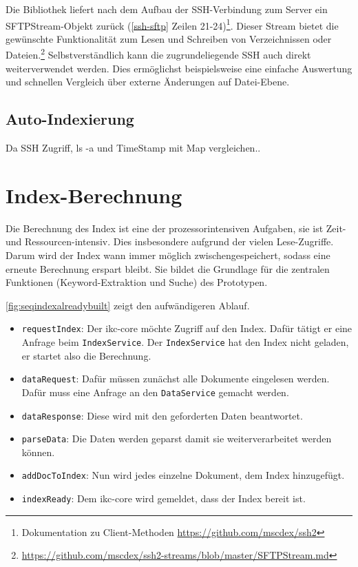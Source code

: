 Die Bibliothek liefert nach dem Aufbau der \gls{SSH}-Verbindung zum Server ein \gls{SFTP}\gls{Stream}-Objekt zurück (\autoref{ssh-sftp} Zeilen 21-24)\footnote{Dokumentation zu Client-Methoden \url{https://github.com/mscdex/ssh2}}. Dieser \gls{Stream} bietet die gewünschte Funktionalität zum Lesen und Schreiben von Verzeichnissen oder Dateien.\footnote{\url{https://github.com/mscdex/ssh2-streams/blob/master/SFTPStream.md}} Selbstverständlich kann die zugrundeliegende \gls{SSH} auch direkt weiterverwendet werden. Dies ermöglichst beispielsweise eine einfache Auswertung und schnellen Vergleich über externe Änderungen auf Datei-Ebene.


\subsection{Auto-Indexierung}

Da SSH Zugriff, ls -a und TimeStamp mit Map vergleichen..

    
\section{Index-Berechnung}

Die Berechnung des Index ist eine der prozessorintensiven Aufgaben, sie ist Zeit- und Ressourcen-intensiv. Dies insbesondere aufgrund der vielen Lese-Zugriffe. Darum wird der Index wann immer möglich zwischengespeichert, sodass eine erneute Berechnung erspart bleibt. Sie bildet die Grundlage für die zentralen Funktionen (\gls{Keyword}-Ex\-trak\-tion und Suche) des Prototypen.  

\autoref{fig:seqindexalreadybuilt} zeigt den aufwändigeren Ablauf. 
\begin{itemize}
    \item \texttt{requestIndex}: Der \gls{ikc-core} möchte Zugriff auf den Index. Dafür tätigt er eine Anfrage beim \texttt{IndexService}. Der \texttt{IndexService} hat den Index nicht geladen, er startet also die Berechnung.
    \item \texttt{dataRequest}: Dafür müssen zunächst alle Dokumente eingelesen werden. Dafür muss eine Anfrage an den \texttt{DataService} gemacht werden.
    \item \texttt{dataResponse}: Diese wird mit den geforderten Daten beantwortet.
    \item \texttt{parseData}: Die Daten werden geparst damit sie weiterverarbeitet werden können.
    \item \texttt{addDocToIndex}: Nun wird jedes einzelne Dokument, dem Index hinzugefügt.
    \item \texttt{indexReady}: Dem \gls{ikc-core} wird gemeldet, dass der Index bereit ist.
\end{itemize}

